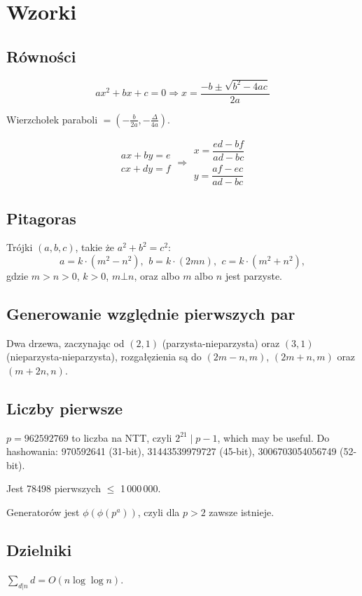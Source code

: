 \chapter{Wzorki}

\section{Równości}
\[ax^2+bx+c=0 \Rightarrow x = \frac{-b\pm\sqrt{b^2-4ac}}{2a}\]

Wierzchołek paraboli $= (- \frac{b}{2a}, - \frac{\Delta}{4a})$.

\[\begin{aligned}ax+by=e\\cx+dy=f\end{aligned}
\Rightarrow
\begin{aligned}x=\dfrac{ed-bf}{ad-bc}\\y=\dfrac{af-ec}{ad-bc}\end{aligned}\]

\section{Pitagoras}
Trójki $(a, b, c)$, takie że $a^2+b^2=c^2$:
 \[ a=k\cdot (m^{2}-n^{2}),\ \,b=k\cdot (2mn),\ \,c=k\cdot (m^{2}+n^{2}), \]
 gdzie $m > n > 0$, $k > 0$, $m \bot n$, oraz albo $m$ albo $n$ jest parzyste.

\section{Generowanie względnie pierwszych par}
Dwa drzewa, zaczynając od $(2, 1)$ (parzysta-nieparzysta) oraz $(3, 1)$ (nieparzysta-nieparzysta), rozgałęzienia są do $(2m-n,m)$, $(2m+n,m)$ oraz $(m+2n,n)$.

\section{Liczby pierwsze}
	$p=962592769$ to liczba na NTT, czyli $2^{21} \mid p-1$, which may be useful. Do hashowania:
	970592641 (31-bit), 31443539979727 (45-bit), 3006703054056749 (52-bit). 

	Jest 78498 pierwszych $\leq$ 1\,000\,000.

	Generatorów jest $\phi(\phi(p^a))$, czyli dla $p>2$ zawsze istnieje.

\section{Dzielniki}
	$\sum_{d|n} d = O(n \log \log n)$.

